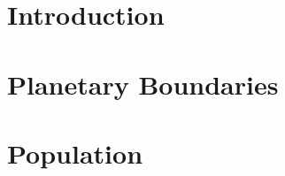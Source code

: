 \documentclass{book}\usepackage[]{graphicx}\usepackage[]{color}
\begin{document}

 \frontmatter                   %

 \mainmatter
    

\chapter{Introduction}
\label{chap:introduction}





\cleardoublepage
    

\chapter{Planetary Boundaries}
\label{chap:planetary_boundaries}





\cleardoublepage
    

\chapter{Population}
\label{chap:population}





\cleardoublepage
    
\end{document}
